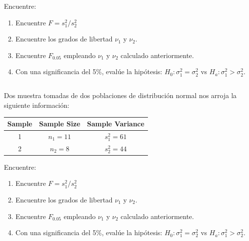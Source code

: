 \documentclass[11pt,letterpaper]{report}
\begin{document}
         Encuentre:

         \begin{enumerate}
             \item Encuentre   $F=s^2_1/s^2_2$
             \item Encuentre los grados de libertad $\nu_1$  y  $\nu_2$.
             \item Encuentre  $F_{0.05}$  empleando $\nu_1$  y  $\nu_2$ calculado anteriormente.
             \item Con una significancia del 5\%, evalúe la hipótesis: $H_0:\sigma^2_1 = \sigma^2_2$ vs $H_a: \sigma^2_1 >\sigma^2_2$.
         \end{enumerate}


       \subsection{}%
         Dos muestra tomadas de dos poblaciones de distribución normal nos arroja la siguiente información:

         \begin{table}[!h]
             \begin{tabular}{ccc}
                 Sample &	Sample Size	&Sample Variance\\
                 \hline
                 1	 & $n_1 = 11$ & 	 $s^2_1 = 61$ \\
                 2	 & $n_2 = 8$ & 	 $s^2_2 = 44$  \\
             \end{tabular}
         \end{table}

         Encuentre:

         \begin{enumerate}
             \item Encuentre   $F=s^2_1/s^2_2$
             \item Encuentre los grados de libertad $\nu_1$  y  $\nu_2$.
             \item Encuentre  $F_{0.05}$  empleando $\nu_1$  y  $\nu_2$ calculado anteriormente.
             \item Con una significancia del 5\%, evalúe la hipótesis: $H_0:\sigma^2_1 = \sigma^2_2$ vs $H_a: \sigma^2_1 >\sigma^2_2$.
         \end{enumerate}
\end{document}
